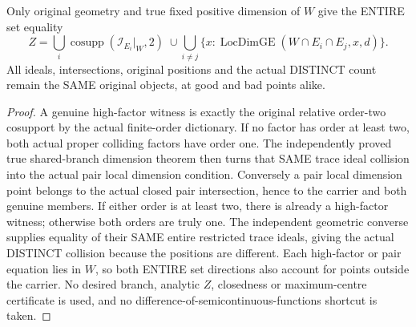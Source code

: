 \begin{theorem}
\label{hir:sharp-original-distinct-defect-entire-finite-geometric-equations}
\leanok
Only original geometry and true fixed positive dimension of $W$ give the
ENTIRE set equality
\[
 Z=\bigcup_i\operatorname{cosupp}(\mathcal I_{E_i}|_W,2)
   \;\cup\!\bigcup_{i\ne j}
   \{x:\operatorname{LocDimGE}(W\cap E_i\cap E_j,x,d)\}.
\]
All ideals, intersections, original positions and the actual DISTINCT count
remain the SAME original objects, at good and bad points alike.
\end{theorem}
\begin{proof}
A genuine high-factor witness is exactly the original relative order-two
cosupport by the actual finite-order dictionary. If no factor has order at
least two, both actual proper colliding factors have order one. The independently
proved true shared-branch dimension theorem then turns that SAME trace ideal
collision into the actual pair local dimension condition. Conversely a pair
local dimension point belongs to the actual closed pair intersection, hence
to the carrier and both genuine members. If either order is at least two,
there is already a high-factor witness; otherwise both orders are truly one.
The independent geometric converse supplies equality of their SAME entire
restricted trace ideals, giving the actual DISTINCT collision because the
positions are different. Each high-factor or pair equation lies in $W$, so
both ENTIRE set directions also account for points outside the carrier.
No desired branch, analytic $Z$, closedness or maximum-centre certificate is
used, and no difference-of-semicontinuous-functions shortcut is taken.
\end{proof}

